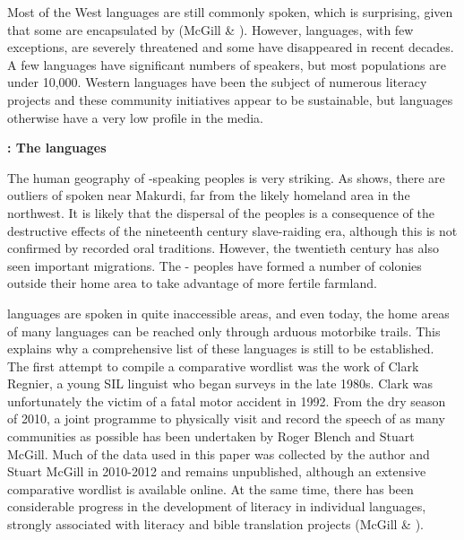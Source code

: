 \documentclass[output=paper]{langsci/langscibook}
\begin{document}
Most of the West  languages are still commonly spoken, which is surprising, given that some are encapsulated by  (McGill \& \citealt{Blench2012}). However,   languages, with few exceptions, are severely threatened and some have disappeared in recent decades. A few  languages have significant numbers of speakers, but most populations are under 10,000. Western  languages have been the subject of numerous literacy projects and these community initiatives appear to be sustainable, but  languages otherwise have a very low profile in the media.

  
 

\textbf{: The  languages}

The human geography of -speaking peoples is very striking. As  shows, there are outliers of  spoken near Makurdi, far from the likely homeland area in the northwest. It is likely that the dispersal of the  peoples is a consequence of the destructive effects of the nineteenth century slave-raiding era, although this is not confirmed by recorded oral traditions. However, the twentieth century has also seen important migrations. The - peoples have formed a number of colonies outside their home area to take advantage of more fertile farmland.

 languages are spoken in quite inaccessible areas, and even today, the home areas of many languages can be reached only through arduous motorbike trails. This explains why a comprehensive list of these languages is still to be established. The first attempt to compile a comparative  wordlist was the work of Clark Regnier, a young SIL linguist who began surveys in the late 1980s. Clark was unfortunately the victim of a fatal motor accident in 1992. From the dry season of 2010, a joint programme to physically visit and record the speech of as many  communities as possible has been undertaken by Roger Blench and Stuart McGill. Much of the data used in this paper was collected by the author and Stuart McGill in 2010-2012 and remains unpublished, although an extensive comparative wordlist is available online. At the same time, there has been considerable progress in the development of literacy in individual languages, strongly associated with literacy and bible translation projects (McGill \& \citealt{Blench2012}).
\end{document}
